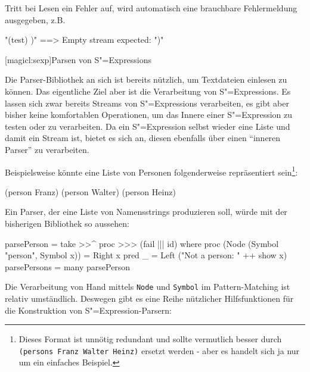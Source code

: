 \documentclass[a4paper, bibgerm]{book}
\newcommand\icode[1]{\lstinline?#1?}
\newcommand\lsection{}
\newcommand{\sexp}{S"=Expression}
\newcommand{\sexps}{S"=Expressions}
\begin{document}
Tritt bei Lesen ein Fehler auf, wird automatisch eine brauchbare Fehlermeldung
ausgegeben, z.B.

\begin{code}
"(test) )"  ==>  Empty stream expected: ")"
\end{code}

\lsection[magicl:sexp]{Parsen von \sexps{}}

Die Parser-Bibliothek an sich ist bereits nützlich, um Textdateien
einlesen zu können. Das eigentliche Ziel aber ist die Verarbeitung von
\sexps{}. Es lassen sich zwar bereits Streams von \sexps{} verarbeiten,
es gibt aber bisher keine komfortablen Operationen, um das Innere einer
\sexp{} zu testen oder zu verarbeiten. Da ein \sexp{} selbst wieder eine
Liste und damit ein Stream ist, bietet es sich an, diesen ebenfalls über
einen "`inneren Parser"' zu verarbeiten.

Beispielsweise könnte eine Liste von Personen folgenderweise
repräsentiert sein\footnote{Dieses Format ist unnötig redundant und
  sollte vermutlich besser durch \icode{(persons Franz Walter Heinz)} ersetzt
  werden - aber es handelt sich ja nur um ein einfaches Beispiel.}:
\begin{code}
(person Franz)
(person Walter)
(person Heinz)
\end{code}

Ein Parser, der eine Liste von Namensstrings produzieren soll, würde mit
der bisherigen Bibliothek so aussehen:

\begin{code}
parsePerson = take >>^ proc >>> (fail ||| id)
  where proc (Node (Symbol "person", Symbol x)) = Right x
        pred _ = Left ("Not a person: " ++ show x)
parsePersons = many parsePerson
\end{code} %

Die Verarbeitung von Hand mittels \icode{Node} und \icode{Symbol} im
Pattern-Matching ist relativ umständlich. Deswegen gibt es eine Reihe
nützlicher Hilfsfunktionen für die Konstruktion von \sexp{}-Parsern:
\end{document}
